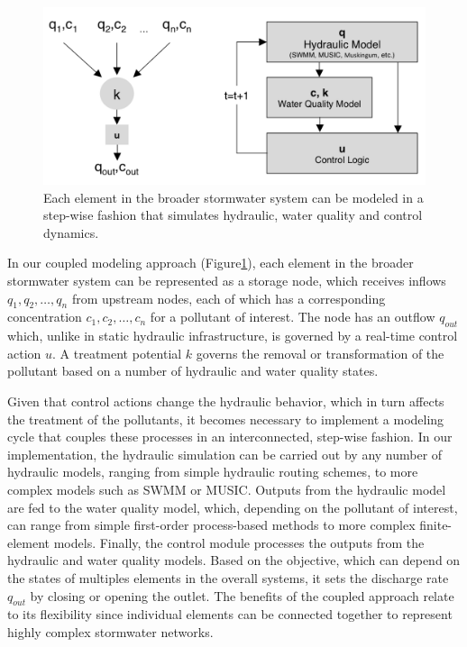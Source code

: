 \begin{figure}
\centering
  \includegraphics[width=\linewidth]{gfx/Chapter-1/coupled_model.png}
  \caption{Each element in the broader stormwater system can be modeled in a step-wise fashion that simulates hydraulic, water quality and control dynamics.}
\label{framework}
\end{figure}

In our coupled modeling approach (Figure\ref{framework}), each element in the
broader stormwater system can be represented as a storage node, which receives
inflows $q_1,q_2,\ldots,q_n$ from upstream nodes, each of which has a corresponding concentration $c_1,c_2,\ldots,c_n$ for a pollutant of interest.
The node has an outflow $q_{out}$ which, unlike in static hydraulic infrastructure, is governed by a real-time control action $u$. 
A treatment potential $k$ governs the removal or transformation of the pollutant based on a number of hydraulic and water quality states.
 
Given that control actions change the hydraulic behavior, which in turn affects the treatment of the pollutants, it becomes necessary to implement a modeling cycle that couples these processes in an interconnected, step-wise fashion. 
In our implementation, the hydraulic simulation can be carried out by any number of hydraulic models, ranging from simple hydraulic routing schemes, to more complex models such as SWMM or MUSIC.
Outputs from the hydraulic model are fed to the water quality model, which, depending on the pollutant of interest, can range from simple first-order process-based methods to more complex finite-element models.
Finally, the control module processes the outputs from the hydraulic and water quality models.
Based on the objective, which can depend on the states of multiples elements in the overall systems, it sets the discharge rate $q_{out}$  by closing or opening the outlet.
The benefits of the coupled approach relate to its flexibility since individual elements can be connected together to represent highly complex stormwater networks.


